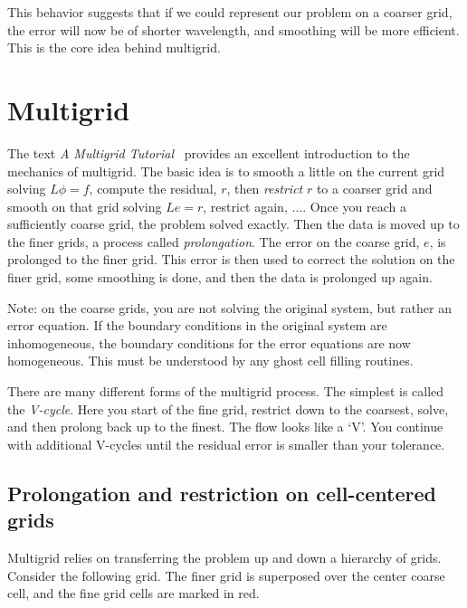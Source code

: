 This behavior suggests that if we could represent our
problem on a coarser grid, the error will now be of shorter
wavelength, and smoothing will be more efficient.  This is the core
idea behind multigrid.



\section{Multigrid}

The text {\em A Multigrid Tutorial}~\cite{multigridtutorial} provides
an excellent introduction to the mechanics of multigrid.  The basic
idea is to smooth a little on the current grid solving $L\phi = f$,
compute the residual, $r$, then {\em restrict} $r$ to a coarser grid and
smooth on that grid solving $Le = r$, restrict again, $\ldots$.  Once
you reach a sufficiently coarse grid, the problem solved exactly.
Then the data is moved up to the finer grids, a process called {\em
  prolongation}.  The error on the coarse grid, $e$, is prolonged to
the finer grid.  This error is then used to correct the solution on
the finer grid, some smoothing is done, and then the data is prolonged
up again.

Note: on the coarse grids, you are not solving the original system,
but rather an error equation.  If the boundary conditions in the
original system are inhomogeneous, the boundary conditions for the
error equations are now homogeneous.  This must be understood by
any ghost cell filling routines.

There are many different forms of the multigrid process.  The simplest 
is called the {\em V-cycle}.  Here you start of the fine grid, restrict
down to the coarsest, solve, and then prolong back up to the finest. 
The flow looks like a `V'.  You continue with additional V-cycles
until the residual error is smaller than your tolerance.

\subsection{Prolongation and restriction on cell-centered grids}

Multigrid relies on transferring the problem up and down a hierarchy of
grids.  Consider the following grid.  The finer grid is superposed over
the center coarse cell, and the fine grid cells are marked in red.

